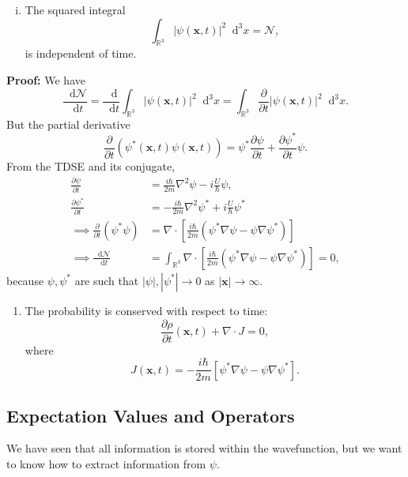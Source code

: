 \documentclass[12pt]{article}
\newcommand{\diff}{\mathop{}\!\mathrm{d}}
\newcommand{\Diff}[1]{\mathop{}\!\mathrm{d}^{#1}}
\theoremstyle{definition}
\theoremstyle{remark}
\begin{document}
\begin{enumerate}[(i)]
	\item The squared integral
		\[
			\int_{\mathbb{R}^3}|\psi(\mathbf{x}, t)|^2\Diff3 x = \mathcal{N}
		,\]
		is independent of time.
\end{enumerate}
\begin{adjustbox}{minipage = \columnwidth - 25.5pt, margin=1em, frame=1pt, margin=0em}
	\textbf{Proof:}  We have
	\[
		\frac{\diff \mathcal{N}}{\diff t} = \frac{\diff}{\diff t} \int_{\mathbb{R}^3} |\psi(\mathbf{x}, t)|^2\Diff 3 x = \int_{\mathbb{R}^3} \frac{\partial}{\partial t}|\psi(\mathbf{x}, t)|^2\Diff3 x
	.\]
	But the partial derivative
	\[
		\frac{\partial}{\partial t}(\psi^{\ast}(\mathbf{x}, t) \psi(\mathbf{x}, t)) = \psi^{\ast} \frac{\partial \psi}{\partial t} + \frac{\partial \psi^{\ast}}{\partial t}\psi
	.\]
	From the TDSE and its conjugate,
	\begin{align*}
		\frac{\partial \psi}{\partial t} &= \frac{i \hbar}{2m} \nabla^2 \psi - i \frac{U}{\hbar}\psi, \\
		\frac{\partial \psi^{\ast}}{\partial t} &= - \frac{i\hbar}{2m} \nabla^2\psi^{\ast} + i \frac{U}{\hbar} \psi^{\ast} \\
		\implies \frac{\partial}{\partial t}(\psi^{\ast}\psi) &= \nabla \cdot \left[\frac{i\hbar}{2m} (\psi^{\ast}\nabla\psi - \psi\nabla\psi^{\ast}) \right] \\
		\implies \frac{\diff \mathcal{N}}{\diff t} &= \int_{\mathbb{R}^3} \nabla \cdot \left[\frac{i \hbar}{2m} (\psi^{\ast}\nabla \psi - \psi \nabla \psi^{\ast})\right] = 0,
	\end{align*}
	because $\psi, \psi^{\ast}$ are such that $|\psi|, |\psi^{\ast}| \to 0$ as $|\mathbf{x}| \to \infty$.
\end{adjustbox}
\begin{enumerate}[resume*]
	\item The probability is conserved with respect to time:
		\[
			\frac{\partial \rho}{\partial t} (\mathbf{x}, t) + \nabla \cdot J = 0
		,\]
		where
		\[
			J(\mathbf{x}, t) = - \frac{i \hbar}{2m} \left[ \psi^{\ast}\nabla \psi - \psi\nabla\psi^{\ast}\right]
		.\]
\end{enumerate}

\subsection{Expectation Values and Operators}%
\label{sub:expectation_values_and_operators}

We have seen that all information is stored within the wavefunction, but we want to know how to extract information from $\psi$.
\end{document}
